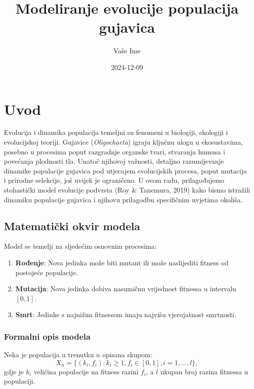 \documentclass[
]{article}
\title{Modeliranje evolucije populacija gujavica}
\author{Vaše Ime}
\date{2024-12-09}
\providecommand{\tightlist}{%
  \setlength{\itemsep}{0pt}\setlength{\parskip}{0pt}}
\begin{document}
\maketitle

\section{Uvod}\label{uvod}

Evolucija i dinamika populacija temeljni su fenomeni u biologiji,
ekologiji i evolucijskoj teoriji. Gujavice (\emph{Oligochaeta}) igraju
ključnu ulogu u ekosustavima, posebno u procesima poput razgradnje
organske tvari, stvaranja humusa i povećanja plodnosti tla. Unatoč
njihovoj važnosti, detaljno razumijevanje dinamike populacije gujavica
pod utjecajem evolucijskih procesa, poput mutacija i prirodne selekcije,
još uvijek je ograničeno. U ovom radu, prilagođujemo stohastički model
evolucije podvrsta (Roy \& Tanemura, 2019) kako bismo istražili dinamiku
populacije gujavica i njihovu prilagodbu specifičnim uvjetima okoliša.

\subsection{Matematički okvir
modela}\label{matematiux10dki-okvir-modela}

Model se temelji na sljedećim osnovnim procesima:

\begin{enumerate}
\def\labelenumi{\arabic{enumi}.}
\tightlist
\item
  \textbf{Rođenje}: Nova jedinka može biti mutant ili može naslijediti
  fitness od postojeće populacije.
\item
  \textbf{Mutacija}: Nova jedinka dobiva nasumičnu vrijednost fitnessa u
  intervalu \([0, 1]\).
\item
  \textbf{Smrt}: Jedinke s najnižim fitnessom imaju najvišu vjerojatnost
  smrtnosti.
\end{enumerate}

\subsubsection{Formalni opis modela}\label{formalni-opis-modela}

Neka je populacija u trenutku \(n\) opisana skupom: \[
X_n = \{(k_i, f_i) : k_i \geq 1, f_i \in [0, 1], i = 1, \dots, l \},
\] gdje je \(k_i\) veličina populacije na fitness razini \(f_i\), a
\(l\) ukupan broj razina fitnessa u populaciji.
\end{document}
